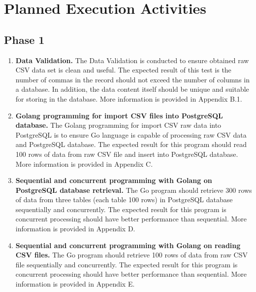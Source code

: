 \section{Planned Execution Activities}

\subsection{Phase 1}

\begin{enumerate}[topsep=0pt,itemsep=-1ex,partopsep=1ex,parsep=1.5ex]
	
	\item \textbf{Data Validation.}
	 The Data Validation is conducted to ensure obtained raw CSV data set is clean and useful. The expected result of this test is the number of commas in the record should not exceed the number of columns in a database. In addition, the data content itself should be unique and suitable for storing in the database. More information is provided in Appendix B.1.
		
	\item \textbf{Golang programming for import CSV files into PostgreSQL database.}
	The Golang programming for import CSV raw data into PostgreSQL is to ensure Go language is capable of processing raw CSV data and PostgreSQL database. The expected result for this program should read 100 rows of data from raw CSV file and insert into PostgreSQL database. More information is provided in Appendix C.
	
	\item \textbf{Sequential and concurrent programming with Golang on PostgreSQL database retrieval.}
    The Go program should retrieve 300 rows of data from three tables (each table 100 rows) in PostgreSQL database sequentially and concurrently. The expected result for this program is concurrent processing should have better performance than sequential. More information is provided in Appendix D.	
	
	\item \textbf{Sequential and concurrent programming with Golang on reading CSV files.}
	The Go program should retrieve 100 rows of data from raw CSV file sequentially and concurrently. The expected result for this program is concurrent processing should have better performance than sequential. More information is provided in Appendix E.
	 
\end{enumerate}

